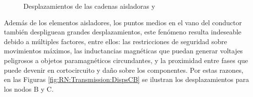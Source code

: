 \begingroup
\centering
\begin{figure}[htbp]
	\centering
	\label{fig:RN:Transmission:DispXAD}
	\label{fig:RN:Transmission:DispZAD}
	\caption{Desplazamientos de las cadenas aisladoras  y } \label{fig:RN:Transmission:DispsAD}
\end{figure}
\endgroup

Además de los elementos aisladores, los puntos medios en el vano del conductor también despliguean grandes desplazamientos, este fenómeno resulta indeseable debido a múltiples factores, entre ellos: las restricciones de seguridad sobre movimientos máximos, las inductancias magnéticas que puedan generar voltajes peligrosos a objetos paramagnéticos circundantes, y la proximidad entre fases que puede devenir en cortocircuito y daño sobre los componentes. Por estas razones, en las Figuras \ref{fig:RN:Transmission:DispsCB} se ilustran los desplazamientos para los nodos $\text{B}$ y $\text{C}$. 



